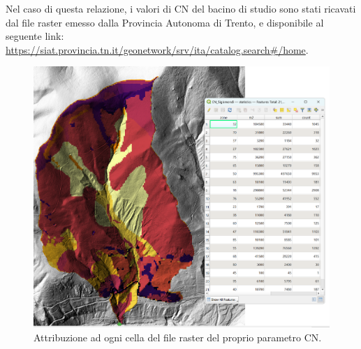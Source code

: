 Nel caso di questa relazione, i valori di CN del bacino di studio sono stati ricavati dal file raster emesso dalla Provincia Autonoma di Trento, e disponibile al seguente link: \url{https://siat.provincia.tn.it/geonetwork/srv/ita/catalog.search#/home}.
\begin{figure}[H]  \centering
    \includegraphics[scale=0.25]{immagini/qgis_cn.png}
    \caption{Attribuzione ad ogni cella del file raster del proprio parametro CN.}
    \label{qgis_cn}
\end{figure}

